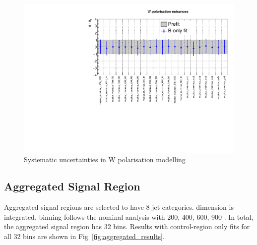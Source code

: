 \begin{figure}[h!]
  \centering
  \caption{Systematic uncertainties in W polarisation modelling}
  \includegraphics[width=0.8\linewidth]{figures/results/36invfb_preapproval/postfit/nuis/WPol_nuisances}
\end{figure}

\subsection{Aggregated Signal Region}
\label{app:aggregated}
Aggregated signal regions are selected to have 8 jet categories. 
\scalht dimension is integrated. \HTmiss binning follows the nominal 
analysis with 200, 400, 600, 900 \gev. In total, the aggregated signal 
region has 32 bins. Results with control-region only fits for all 32 bins 
are shown in Fig~\ref{fig:aggregated_results}.

